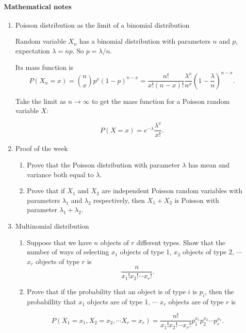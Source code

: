 \documentclass[12pt]{article}
\begin{document}
\paragraph*{Mathematical notes}



\begin{enumerate}

\item Poisson distribution as the limit of a binomial distribution

Random variable $X_n$ has a binomial distribution with parameters $n$ and $p$, expectation $\lambda = np$. So $p = \lambda / n.$

Its mass function is $$P(X_n = x) = \binom{n}{x}p^x(1-p)^{n-x}=  \frac{n!}{x!(n-x)!} \frac{\lambda^x}{n^x} (1-\frac{\lambda}{n})^{n-x}.$$

Take the limit as $n \rightarrow \infty$ to get the mass function for a Poisson random variable $X$:

$$P(X = x) = e^{-\lambda}\frac{\lambda^x}{x!}.$$


\pagebreak


\item Proof of the week
\begin{enumerate}


\item Prove that the Poisson distribution with parameter $\lambda$ has mean and variance both equal to $\lambda$.

\item Prove that if $X_1$ and $X_2$ are independent Poisson random variables with parameters $\lambda_1$ and $\lambda_2$ respectively, then $X_1 + X_2$ is Poisson with parameter $\lambda_1 + \lambda_2$.

\end{enumerate}

\pagebreak

\item Multinomial distribution

\begin{enumerate}

\item Suppose that we have $n$ objects of $r$ different types. Show that the number of ways of selecting $x_1$ objects of type 1, $x_2$ objects of type 2, $\cdots$ $x_r$ objects of type $r$ is 
$$\frac{n}{x_1!x_2! \cdots x_r!}.$$

\item Prove that if the probability that an object is of type $i$ is $p_i$, then the probabillity that $x_1$ objects are of type 1, $\cdots$ $x_r$ objects are of type $r$ is

$$P(X_1 = x_1, X_2 = x_2, \cdots X_r = x_r )= \frac{n!}{x_1!x_2! \cdots x_r!} p_1^{x_1} p_2^{x_2}\cdots p_r^{x_r}.$$


\end{enumerate}

\end{enumerate}
\end{document}
